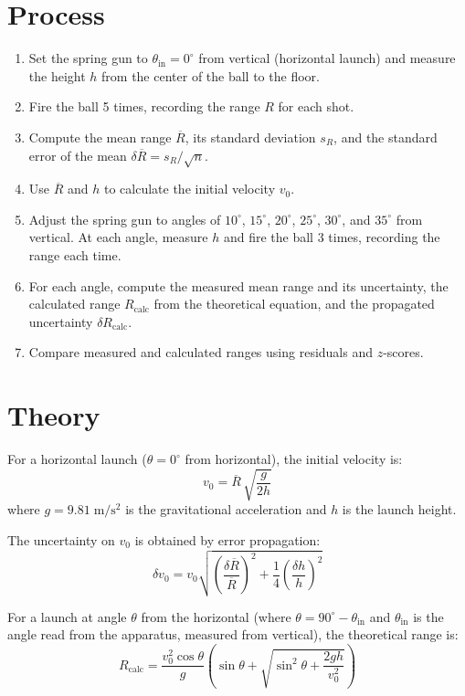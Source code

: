 \documentclass[12pt]{article}
\begin{document}
\section*{Process}
\begin{enumerate}[nosep]
    \item Set the spring gun to $\theta_{\mathrm{in}} = 0^\circ$ from vertical (horizontal launch) and measure the height $h$ from the center of the ball to the floor.
    \item Fire the ball 5 times, recording the range $R$ for each shot.
    \item Compute the mean range $\overline{R}$, its standard deviation $s_R$, and the standard error of the mean $\delta\overline{R} = s_R / \sqrt{n}$.
    \item Use $\overline{R}$ and $h$ to calculate the initial velocity $v_0$.
    \item Adjust the spring gun to angles of $10^\circ$, $15^\circ$, $20^\circ$, $25^\circ$, $30^\circ$, and $35^\circ$ from vertical. At each angle, measure $h$ and fire the ball 3 times, recording the range each time.
    \item For each angle, compute the measured mean range and its uncertainty, the calculated range $R_{\mathrm{calc}}$ from the theoretical equation, and the propagated uncertainty $\delta R_{\mathrm{calc}}$.
    \item Compare measured and calculated ranges using residuals and $z$-scores.
\end{enumerate}

\section*{Theory}

For a horizontal launch ($\theta = 0^\circ$ from horizontal), the initial velocity is:
\[
    v_0 = \overline{R}\,\sqrt{\frac{g}{2h}}
\]
where $g = 9.81\;\mathrm{m/s^2}$ is the gravitational acceleration and $h$ is the launch height.

The uncertainty on $v_0$ is obtained by error propagation:
\[
    \delta v_0 = v_0 \sqrt{\left(\frac{\delta\overline{R}}{\overline{R}}\right)^2 + \frac{1}{4}\left(\frac{\delta h}{h}\right)^2}
\]

For a launch at angle $\theta$ from the horizontal (where $\theta = 90^\circ - \theta_{\mathrm{in}}$ and $\theta_{\mathrm{in}}$ is the angle read from the apparatus, measured from vertical), the theoretical range is:
\[
    R_{\mathrm{calc}} = \frac{v_0^2 \cos\theta}{g}\left(\sin\theta + \sqrt{\sin^2\theta + \frac{2gh}{v_0^2}}\right)
\]
\end{document}
